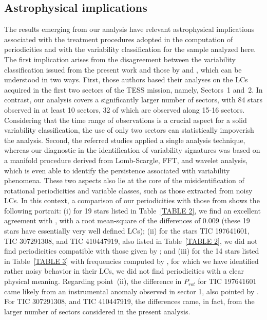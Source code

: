 \documentclass[RNAAS]{aastex63}
\begin{document}
\subsection{Astrophysical implications} \label{subsec:astrophys}

The results emerging from our analysis have relevant astrophysical implications associated with the treatment procedures adopted in the computation of periodicities and with the variability classification for the sample analyzed here. The first implication arises from the disagreement between the variability classification issued from the present work and those by \citet{Balona2019} and \citet{Pedersen2019}, which can be understood in two ways. First, those authors based their analyses on the LCs acquired in the first two sectors of the TESS mission, namely, Sectors~1 and~2. In contrast, our analysis covers a significantly larger number of sectors, with 84 stars observed in at least 10 sectors, 32 of which are observed along 15-16 sectors. Considering that the time range of observations is a crucial aspect for a solid variability classification, the use of only two sectors can statistically impoverish the analysis. Second, the referred studies applied a single analysis technique, whereas our diagnostic in the identification of variability signatures was based on a manifold procedure derived from Lomb-Scargle, FFT, and wavelet analysis, which is even able to identify the persistence associated with variability phenomena. These two aspects also lie at the core of the misidentification of rotational periodicities and variable classes, such as those extracted from noisy LCs. In this context, a comparison of our periodicities with those from  \citet{Balona2019} shows the following portrait: (i) for 19 stars listed in Table~\ref{TABLE 2}, we find an excellent agreement with \citet{Balona2019}, with a root mean-square of the differences of 0.009 (these 19 stars have essentially very well defined LCs); (ii) for the stars TIC 197641601, TIC 307291308, and TIC 410447919, also listed in Table~\ref{TABLE 2}, we did not find periodicities compatible with those given by \citet{Balona2019}; and (iii) for the 14 stars listed in Table~\ref{TABLE 3} with frequencies computed by \citet{Balona2019}, for which we have identified rather noisy behavior in their LCs, we did not find periodicities with a clear physical meaning. Regarding point~(ii), the difference in $P_{rot}$ for TIC 197641601 came likely from an instrumental anomaly observed in sector 1, also pointed by \citet{Pedersen2019}. For TIC 307291308, and TIC 410447919, the differences came, in fact, from the larger number of sectors considered in the present analysis.
\end{document}
